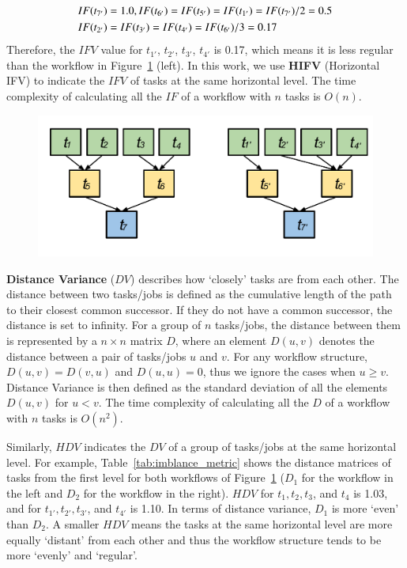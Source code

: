 \begin{eqnarray}
	\displaystyle  
	&IF(t_{7'})=1.0, IF(t_{6'})=IF(t_{5'})=IF(t_{1'})=IF(t_{7'})/2=0.5\nonumber \\
	&IF(t_{2'})=IF(t_{3'})=IF(t_{4'})=IF(t_{6'})/3=0.17 \nonumber
\end{eqnarray}
Therefore, the $IFV$ value for {$t_{1'}$, $t_{2'}$, $t_{3'}$, $t_{4'}$} is 0.17, which means it is less regular than the workflow in Figure~\ref{fig:imbalance_hifv} (left). In this work, we use \textbf{HIFV} (Horizontal IFV) to indicate the $IFV$ of tasks at the same horizontal level. The time complexity of calculating all the $IF$ of a workflow with $n$ tasks is $O(n)$.  

\begin{figure}[htb]
	\centering
	\includegraphics[width=0.85\linewidth]{figures/imbalance/dependency.pdf}
	\label{fig:imbalance_hifv}
\end{figure}

\textbf{Distance Variance} ($DV$) describes how `closely' tasks are from each other. The distance between two tasks/jobs is defined as the cumulative length of the path to their closest common successor. If they do not have a common successor, the distance is set to infinity. For a group of $n$ tasks/jobs, the distance between them is represented by a $n \times n$ matrix $D$, where an element $D(u,v)$ denotes the distance between a pair of tasks/jobs $u$ and $v$. For any workflow structure, $D(u,v)=D(v,u)$ and $D(u,u)=0$, thus we ignore the cases when $u \geq v$. Distance Variance is then defined as the standard deviation of all the elements $D(u,v)$ for $u<v$. The time complexity of calculating all the $D$ of a workflow with $n$ tasks is $O(n^2)$. 

Similarly, $HDV$ indicates the $DV$ of a group of tasks/jobs at the same horizontal level. For example, Table~\ref{tab:imblance_metric} shows the distance matrices of tasks from the first level for both workflows of Figure~\ref{fig:imbalance_hifv} ($D_1$ for the workflow in the left and $D_2$ for the workflow in the right). $HDV$ for $t_1, t_2, t_3$, and $t_4$ is 1.03, and for $t_{1'}, t_{2'}, t_{3'}$, and $t_{4'}$ is 1.10. In terms of distance variance, $D_1$ is more `even' than $D_2$. A smaller $HDV$ means the tasks at the same horizontal level are more equally `distant' from each other and thus the workflow structure tends to be more `evenly' and `regular'. 

